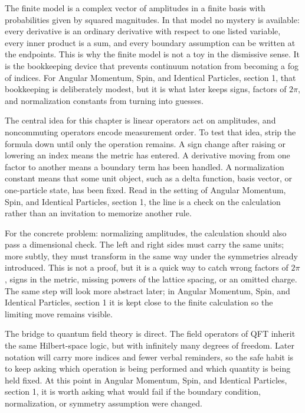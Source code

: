 The finite model is a complex vector of amplitudes in a finite basis with probabilities given by squared magnitudes.  In that model no mystery is available: every derivative is an ordinary derivative with respect to one listed variable, every inner product is a sum, and every boundary assumption can be written at the endpoints.  This is why the finite model is not a toy in the dismissive sense.  It is the bookkeeping device that prevents continuum notation from becoming a fog of indices.  For Angular Momentum, Spin, and Identical Particles, section 1, that bookkeeping is deliberately modest, but it is what later keeps signs, factors of \(2\pi\), and normalization constants from turning into guesses.

The central idea for this chapter is linear operators act on amplitudes, and noncommuting operators encode measurement order.  To test that idea, strip the formula down until only the operation remains.  A sign change after raising or lowering an index means the metric has entered.  A derivative moving from one factor to another means a boundary term has been handled.  A normalization constant means that some unit object, such as a delta function, basis vector, or one-particle state, has been fixed.  Read in the setting of Angular Momentum, Spin, and Identical Particles, section 1, the line is a check on the calculation rather than an invitation to memorize another rule.

For the concrete problem: normalizing amplitudes, the calculation should also pass a dimensional check.  The left and right sides must carry the same units; more subtly, they must transform in the same way under the symmetries already introduced.  This is not a proof, but it is a quick way to catch wrong factors of \(2\pi\), signs in the metric, missing powers of the lattice spacing, or an omitted charge.  The same step will look more abstract later; in Angular Momentum, Spin, and Identical Particles, section 1 it is kept close to the finite calculation so the limiting move remains visible.

The bridge to quantum field theory is direct.  The field operators of QFT inherit the same Hilbert-space logic, but with infinitely many degrees of freedom.  Later notation will carry more indices and fewer verbal reminders, so the safe habit is to keep asking which operation is being performed and which quantity is being held fixed.  At this point in Angular Momentum, Spin, and Identical Particles, section 1, it is worth asking what would fail if the boundary condition, normalization, or symmetry assumption were changed.

